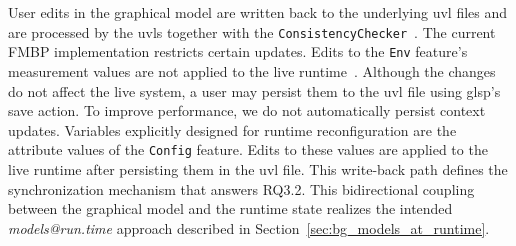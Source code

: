 User edits in the graphical model are written back to the underlying \gls{uvl} files and are processed by the \gls{uvls} together with the \texttt{ConsistencyChecker}~\cite{felber_comprehensible_2025}.
The current FMBP implementation restricts certain updates.
Edits to the \texttt{Env} feature's measurement values are not applied to the live runtime~\cite{felber_tfelbrfmbp_2025}.
Although the changes do not affect the live system, a user may persist them to the \gls{uvl} file using \gls{glsp}'s save action.
To improve performance, we do not automatically persist context updates.
Variables explicitly designed for runtime reconfiguration are the attribute values of the \texttt{Config} feature.
Edits to these values are applied to the live runtime after persisting them in the \gls{uvl} file.
This write-back path defines the synchronization mechanism that answers RQ3.2.
This bidirectional coupling between the graphical model and the runtime state realizes the intended \textit{models@run.time} approach described in Section~\ref{sec:bg_models_at_runtime}.